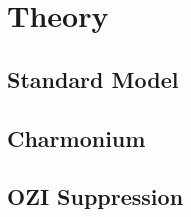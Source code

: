 \chapter{Theory}
\label{ch_theory}

\section{Standard Model}

\section{Charmonium}

\section{OZI Suppression}